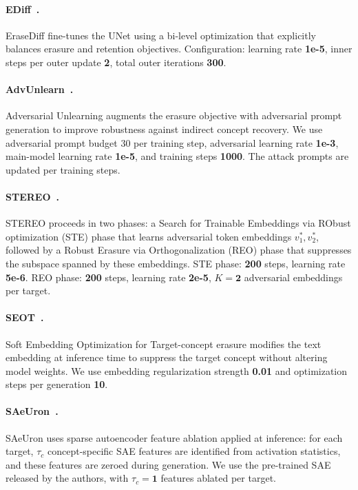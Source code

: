 \paragraph{EDiff~\citep{wu2024erasediff}.} 
EraseDiff fine-tunes the UNet using a bi-level optimization that explicitly balances erasure and retention objectives. Configuration: learning rate \textbf{1e-5}, inner steps per outer update \textbf{2}, total outer iterations \textbf{300}.
\paragraph{AdvUnlearn~\citep{zhang2024defensive}.} 
Adversarial Unlearning augments the erasure objective with adversarial prompt generation to improve robustness against indirect concept recovery. We use adversarial prompt budget 30 per training step, adversarial learning rate \textbf{1e-3}, main-model learning rate \textbf{1e-5}, and training steps \textbf{1000}. The attack prompts are updated per training steps.
\paragraph{STEREO~\citep{srivatsan2025stereo}.} 
STEREO proceeds in two phases: a Search for Trainable Embeddings via RObust optimization (STE) phase that learns adversarial token embeddings $v_1^*, v_2^*$, followed by a Robust Erasure via Orthogonalization (REO) phase that suppresses the subspace spanned by these embeddings. STE phase: \textbf{200} steps, learning rate 
\textbf{5e-6}. REO phase: \textbf{200} steps, learning rate \textbf{2e-5}, $K = \textbf{2}$ adversarial embeddings per target.
\paragraph{SEOT~\citep{li2024get}.} 
Soft Embedding Optimization for Target-concept erasure modifies the text embedding at inference time to suppress the target concept without altering model weights. We use embedding regularization strength \textbf{0.01} and optimization steps per generation \textbf{10}.
\paragraph{SAeUron~\citep{cywinski2025saeuron}.} 
SAeUron uses sparse autoencoder feature ablation applied at inference: for each target, $\tau_c$ concept-specific SAE features are identified from activation statistics, and these features are zeroed during generation. We use the pre-trained SAE released by the authors, with 
$\tau_c = \textbf{1}$ features ablated per target. 


